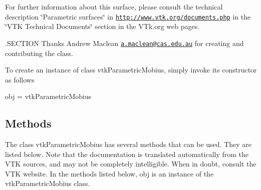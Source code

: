 For further information about this surface, please consult the technical description \char`\"{}\-Parametric surfaces\char`\"{} in \href{http://www.vtk.org/documents.php}{\tt http\-://www.\-vtk.\-org/documents.\-php} in the \char`\"{}\-V\-T\-K Technical Documents\char`\"{} section in the V\-Tk.\-org web pages.

.S\-E\-C\-T\-I\-O\-N Thanks Andrew Maclean \href{mailto:a.maclean@cas.edu.au}{\tt a.\-maclean@cas.\-edu.\-au} for creating and contributing the class.

To create an instance of class vtk\-Parametric\-Mobius, simply invoke its constructor as follows \begin{DoxyVerb}  obj = vtkParametricMobius
\end{DoxyVerb}
 \hypertarget{vtkwidgets_vtkxyplotwidget_Methods}{}\subsection{Methods}\label{vtkwidgets_vtkxyplotwidget_Methods}
The class vtk\-Parametric\-Mobius has several methods that can be used. They are listed below. Note that the documentation is translated automatically from the V\-T\-K sources, and may not be completely intelligible. When in doubt, consult the V\-T\-K website. In the methods listed below, {\ttfamily obj} is an instance of the vtk\-Parametric\-Mobius class. 
